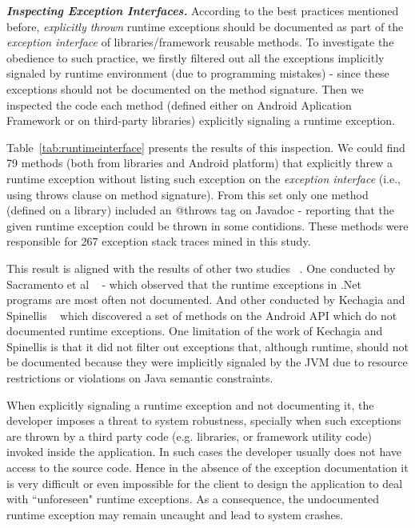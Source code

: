 \documentclass[conference]{IEEEtran}
\begin{document}
\emph{\textbf{Inspecting Exception Interfaces.}}  According to the best practices mentioned before, 
 \emph{explicitly thrown} runtime exceptions 
should be documented as part of the \emph{exception interface} of libraries/framework reusable
methods. To investigate the obedience to such practice, we firstly filtered out all the exceptions implicitly
 signaled by  runtime environment (due to programming mistakes) - since these exceptions 
should not be documented on the method signature.  Then we inspected the code each method 
(defined either on Android  Aplication Framework or on third-party libraries) 
explicitly signaling a runtime exception.

Table~\ref{tab:runtimeinterface} presents the results of this inspection. 
We could find 79 methods (both from libraries and Android platform) that  explicitly threw a runtime exception 
without listing such exception on the \emph{exception interface} (i.e., using 
throws clause on method signature). From this set only one method (defined on a library)
included an @throws tag on Javadoc - reporting that the given runtime exception
could be thrown in some contidions. These methods were responsible for 
267 exception stack traces mined in this study.

This result is aligned with the results of other two studies ~\cite{sacramento2006unchecked,kechagia2014}. 
One conducted by  Sacramento et al ~\cite{sacramento2006unchecked} - which observed that the
runtime exceptions in .Net programs are most often not documented. And other conducted by 
Kechagia and Spinellis ~\cite{kechagia2014} which discovered a set of methods 
on the Android API which do not documented runtime exceptions. One limitation 
of the work of Kechagia and Spinellis is that it did not filter out exceptions that,  
although runtime, should not be documented because they were implicitly signaled by the 
JVM due to resource restrictions or violations on Java semantic constraints.

When explicitly signaling a runtime exception and not documenting it, 
the developer imposes a threat to system robustness, specially
when such exceptions are thrown by a third party code (e.g. libraries, or framework utility code)
 invoked inside the application. In such cases the developer usually does not have access to 
the source code. Hence in the absence of the exception documentation it is very difficult or even impossible
 for the client to design the application to deal with ``unforeseen" runtime exceptions. As a consequence, the
 undocumented runtime exception may remain uncaught and lead to system crashes.
\end{document}
